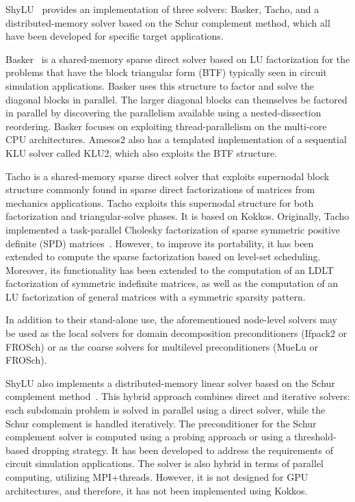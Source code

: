 ShyLU~\cite{ShyLUCore2014} provides an implementation of three solvers: Basker, Tacho, and a distributed-memory solver based on the Schur complement method, which all have been developed for specific target applications.

Basker~\cite{Basker2017} is a shared-memory sparse direct solver based on LU factorization for the problems that have the block triangular form (BTF) typically seen in circuit simulation applications. Basker uses this structure to factor and solve the diagonal blocks in parallel. The larger diagonal blocks can themselves be factored in parallel by discovering the parallelism available using a nested-dissection reordering. Basker focuses on exploiting thread-parallelism on the multi-core CPU architectures.
Amesos2 also has a templated implementation of a sequential KLU solver called KLU2, which also exploits the BTF structure.

Tacho is a shared-memory sparse direct solver that exploits supernodal block structure commonly found in sparse direct factorizations of matrices from mechanics applications. Tacho exploits this supernodal structure for both factorization and triangular-solve phases. It is based on Kokkos. Originally, Tacho implemented a task-parallel Cholesky factorization of sparse symmetric positive definite (SPD) matrices~\cite{Tacho2018}. However, to improve its portability, it has been extended to compute the sparse factorization based on level-set scheduling. Moreover, its functionality has been extended to the computation of an LDLT factorization of symmetric indefinite matrices, as well as the computation of an LU factorization of general matrices with a symmetric sparsity pattern.

In addition to their stand-alone use, the aforementioned node-level solvers may be used as the local solvers for domain decomposition preconditioners (Ifpack2 or FROSch) or as the coarse solvers for multilevel preconditioners (MueLu or FROSch).

ShyLU also implements a distributed-memory linear solver based on the Schur complement method~\cite{ShyLUCore2014}. This hybrid approach combines direct and iterative solvers: each subdomain problem is solved in parallel using a direct solver, while the Schur complement is handled iteratively. The preconditioner for the Schur complement solver is computed using a probing approach or using a threshold-based dropping strategy. It has been developed to address the requirements of circuit simulation applications. The solver is also hybrid in terms of parallel computing, utilizing MPI+threads. However, it is not designed for GPU architectures, and therefore, it has not been implemented using Kokkos.

